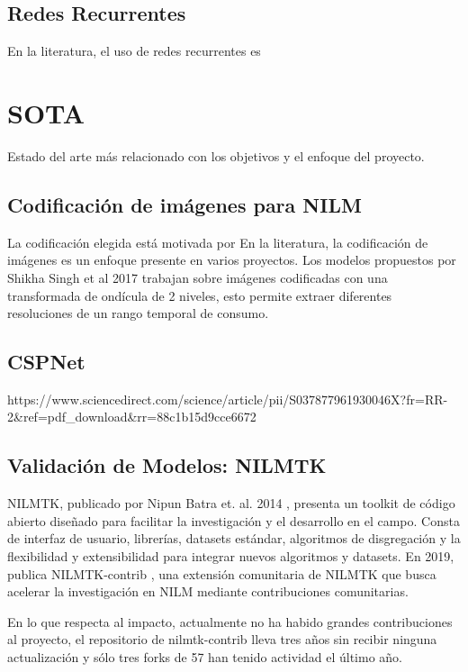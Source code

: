 \subsection{Redes Recurrentes}
En la literatura, el uso de redes recurrentes es 



\section{SOTA}
\label{SOTA}
Estado del arte más relacionado con los objetivos y el enfoque del proyecto.
\subsection{Codificación de imágenes para NILM} 
La codificación elegida está motivada por  
En la literatura, la codificación de imágenes es un enfoque presente en varios proyectos. Los modelos propuestos por Shikha Singh et al 2017 \autocite{Singh2017} trabajan sobre imágenes codificadas con una transformada de ondícula de 2 niveles, esto permite extraer diferentes resoluciones de un rango temporal de consumo.

\subsection{CSPNet}     
https://www.sciencedirect.com/science/article/pii/S037877961930046X?fr=RR-2&ref=pdf_download&rr=88c1b15d9cce6672

\subsection{Validación de Modelos: NILMTK}  
NILMTK, publicado por Nipun Batra et. al. 2014 \autocite{Nipun2014}, presenta un toolkit de código abierto diseñado para facilitar la investigación y el desarrollo en el campo. Consta de interfaz de usuario, librerías, datasets estándar, algoritmos de disgregación y la flexibilidad y extensibilidad para integrar nuevos algoritmos y datasets. 
En 2019, publica NILMTK-contrib \autocite{Nipun2019}, una extensión comunitaria de NILMTK que busca acelerar la investigación en NILM mediante contribuciones comunitarias. 

En lo que respecta al impacto, actualmente no ha habido grandes contribuciones al proyecto, el repositorio de nilmtk-contrib lleva tres años sin recibir ninguna actualización y sólo tres forks de 57 han tenido actividad el último año.
